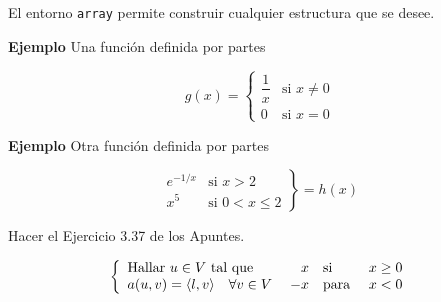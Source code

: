\documentclass[11pt,a4paper]{report}
\begin{document}
\bigskip
El entorno \texttt{array} permite construir cualquier estructura que se desee.





\bigskip
\textbf{Ejemplo} Una función definida por partes

\begin{equation*}
g(x)=\left\{
\begin{array}{ll}
\dfrac{1}{x} & \text{si }x\neq0 \\[10pt]
0            & \text{si }x=0
\end{array}
\right.
\end{equation*}

\bigskip





\bigskip
\textbf{Ejemplo} Otra función definida por partes

\begin{equation*}
\left.
\begin{array}{lr}
e^{-1/x} & \text{si }x>2 \\
x^5 & \text{si }0<x\leq2
\end{array}
\right\}=h(x)
\end{equation*}

\bigskip





\bigskip
 Hacer el Ejercicio 3.37 de los Apuntes.

\begin{equation*}
\left\{
\begin{array}{l}
\text{Hallar }u\in V\text{ tal que } \\
a(u,v)=\langle l,v \rangle \quad \forall v \in V
\end{array}
\right.\\
\begin{array}{rll}
x & \text{si } &x\geq0 \\
-x & \text{para }&x<0 
\end{array}
\end{equation*}
\bigskip
\end{document}
